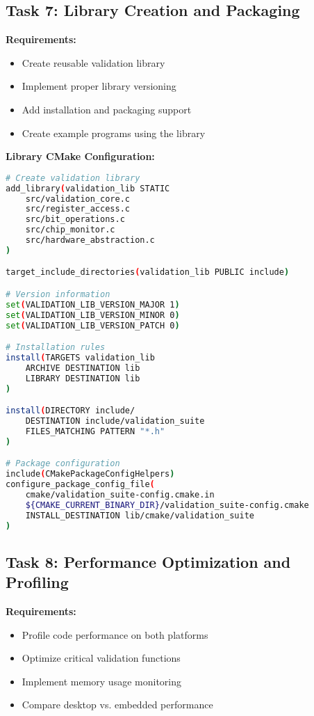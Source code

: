 \documentclass[11pt,a4paper]{article}
\begin{document}
\subsection{Task 7: Library Creation and Packaging}

\textbf{Requirements:}
\begin{itemize}
    \item Create reusable validation library
    \item Implement proper library versioning
    \item Add installation and packaging support
    \item Create example programs using the library
\end{itemize}

\textbf{Library CMake Configuration:}
\begin{lstlisting}[language=bash]
# Create validation library
add_library(validation_lib STATIC
    src/validation_core.c
    src/register_access.c
    src/bit_operations.c
    src/chip_monitor.c
    src/hardware_abstraction.c
)

target_include_directories(validation_lib PUBLIC include)

# Version information
set(VALIDATION_LIB_VERSION_MAJOR 1)
set(VALIDATION_LIB_VERSION_MINOR 0)
set(VALIDATION_LIB_VERSION_PATCH 0)

# Installation rules
install(TARGETS validation_lib
    ARCHIVE DESTINATION lib
    LIBRARY DESTINATION lib
)

install(DIRECTORY include/
    DESTINATION include/validation_suite
    FILES_MATCHING PATTERN "*.h"
)

# Package configuration
include(CMakePackageConfigHelpers)
configure_package_config_file(
    cmake/validation_suite-config.cmake.in
    ${CMAKE_CURRENT_BINARY_DIR}/validation_suite-config.cmake
    INSTALL_DESTINATION lib/cmake/validation_suite
)
\end{lstlisting}

\subsection{Task 8: Performance Optimization and Profiling}

\textbf{Requirements:}
\begin{itemize}
    \item Profile code performance on both platforms
    \item Optimize critical validation functions
    \item Implement memory usage monitoring
    \item Compare desktop vs. embedded performance
\end{itemize}
\end{document}
